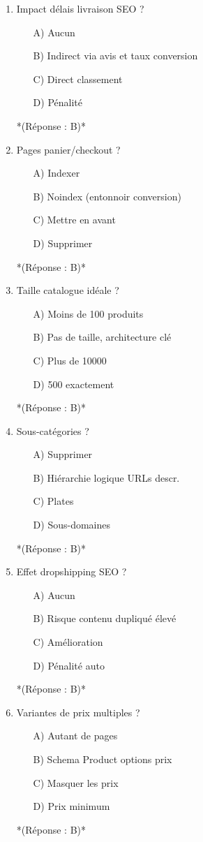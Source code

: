 \documentclass[12pt,a4paper,twoside]{report}
\begin{document}
\begin{enumerate}
\item Impact délais livraison SEO ?
\begin{itemize}
\item[A)] Aucun
\item[B)] Indirect via avis et taux conversion
\item[C)] Direct classement
\item[D)] Pénalité
\end{itemize}
*(Réponse : B)*

\item Pages panier/checkout ?
\begin{itemize}
\item[A)] Indexer
\item[B)] Noindex (entonnoir conversion)
\item[C)] Mettre en avant
\item[D)] Supprimer
\end{itemize}
*(Réponse : B)*

\item Taille catalogue idéale ?
\begin{itemize}
\item[A)] Moins de 100 produits
\item[B)] Pas de taille, architecture clé
\item[C)] Plus de 10000
\item[D)] 500 exactement
\end{itemize}
*(Réponse : B)*

\item Sous-catégories ?
\begin{itemize}
\item[A)] Supprimer
\item[B)] Hiérarchie logique URLs descr.
\item[C)] Plates
\item[D)] Sous-domaines
\end{itemize}
*(Réponse : B)*

\item Effet dropshipping SEO ?
\begin{itemize}
\item[A)] Aucun
\item[B)] Risque contenu dupliqué élevé
\item[C)] Amélioration
\item[D)] Pénalité auto
\end{itemize}
*(Réponse : B)*

\item Variantes de prix multiples ?
\begin{itemize}
\item[A)] Autant de pages
\item[B)] Schema Product options prix
\item[C)] Masquer les prix
\item[D)] Prix minimum
\end{itemize}
*(Réponse : B)*


\end{enumerate}
\end{document}
